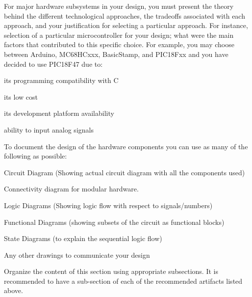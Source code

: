 \documentclass[../main.tex]{subfiles}
\begin{document}
\begin{newrequirements}
    \begin{todolist}
        \item[\done] For major hardware subsystems in your 
            design, you must present the theory 
            behind the different technological 
            approaches, the tradeoffs associated 
            with each approach, and your 
            justification for selecting a 
            particular approach. For instance, 
            selection of a particular 
            microcontroller for your design; what 
            were the main factors that contributed 
            to this specific choice. For example, 
            you may choose between Arduino, 
            MC68HCxxx, BasicStamp, and PIC18Fxx and 
            you have decided to use PIC18F47 due 
            to: 

        \begin{todolist}
        \item its programming compatibility with C 

        \item its low cost 

        \item its development platform availability 

        \item ability to input analog signals 
        \end{todolist}

        \item To document the design of the hardware 
        components you can use as many of the 
        following as possible: 

        \begin{todolist}
        \item Circuit Diagram (Showing actual circuit 
        diagram with all the components used) 

        \item Connectivity diagram for modular 
        hardware. 

        \item Logic Diagrams (Showing logic flow with 
        respect to signals/numbers) 

        \item Functional Diagrams (showing subsets of 
        the circuit as functional blocks) 

        \item State Diagrams (to explain the 
        sequential logic flow) 

        \item Any other drawings to communicate your 
        design 
        \end{todolist}

        \item Organize the content of this section 
        using appropriate subsections. It is 
        recommended to have a sub-section of 
        each of the recommended artifacts 
        listed above. 

    \end{todolist}
\end{newrequirements}
\end{document}
